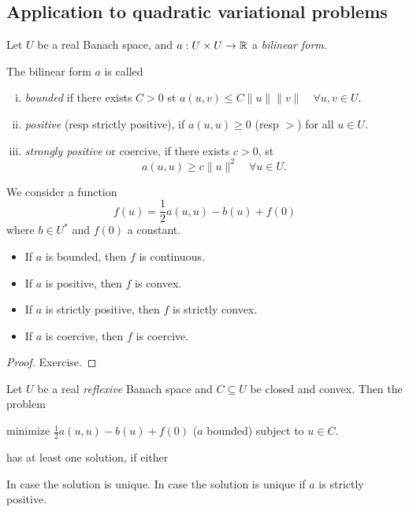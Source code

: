 \documentclass[../skript.tex]{subfiles}
\begin{document}
\subsection{Application to quadratic variational problems}
Let $U$ be a real Banach space, and $a : U \times U \to \mathbb{R}$ a \emph{bilinear form}.
\begin{definition} %
\label{def:c1e15}
The bilinear form $a$ is called
\begin{enumerate}[(i)]
\item \emph{bounded} if there exists $C > 0$ \ac{st} $a(u, v) \leq C \| u \| \| v \| \quad \forall u, v \in U$.
\item \emph{positive} (\ac{resp} strictly positive), if $a(u, u) \geq 0$ (\ac{resp} $>$) for all $u \in U$.
\item \emph{strongly positive} or coercive, if there exists $c > 0$, \ac{st}
\[
	a(u, u) \geq c \| u \|^2 \quad \forall u \in U.
\]
\end{enumerate}
\end{definition}
We consider a function
\[
	f(u) = \frac{1}{2} a(u, u) - b(u) + f(0)
\]
where $b \in U^*$ and $f(0)$ a constant.
\begin{proposition} %
\label{thm:c1e16}
\begin{itemize}
\item If $a$ is bounded, then $f$ is continuous.
\item If $a$ is positive, then $f$ is convex.
\item If $a$ is strictly positive, then $f$ is strictly convex.
\item If $a$ is coercive, then $f$ is coercive.
\end{itemize}
\end{proposition}
\begin{proof}
Exercise.
\end{proof}
\begin{proposition} %
\label{thm:c1e17}
Let $U$ be a real \emph{reflexive} Banach space and $C \subseteq U$ be closed and convex. Then the problem
\begin{mdframed}[style=theoremframing]
minimize $\frac{1}{2} a(u, u) - b(u) + f(0)$ ($a$ bounded) subject to $u \in C$.
\end{mdframed}
has at least one solution, if either
In case  the solution is unique. In case  the solution is unique if $a$ is strictly positive.
\end{proposition}
\end{document}

